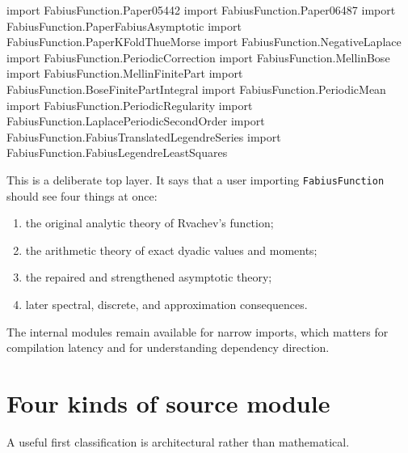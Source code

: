 \documentclass[11pt,a4paper,openany]{book}
\begin{document}
\begin{LeanCode}
import FabiusFunction.Paper05442
import FabiusFunction.Paper06487
import FabiusFunction.PaperFabiusAsymptotic
import FabiusFunction.PaperKFoldThueMorse
import FabiusFunction.NegativeLaplace
import FabiusFunction.PeriodicCorrection
import FabiusFunction.MellinBose
import FabiusFunction.MellinFinitePart
import FabiusFunction.BoseFinitePartIntegral
import FabiusFunction.PeriodicMean
import FabiusFunction.PeriodicRegularity
import FabiusFunction.LaplacePeriodicSecondOrder
import FabiusFunction.FabiusTranslatedLegendreSeries
import FabiusFunction.FabiusLegendreLeastSquares
\end{LeanCode}

This is a deliberate top layer.  It says that a user importing
\texttt{FabiusFunction} should see four things at once:
\begin{enumerate}
  \item the original analytic theory of Rvachev's function;
  \item the arithmetic theory of exact dyadic values and moments;
  \item the repaired and strengthened asymptotic theory;
  \item later spectral, discrete, and approximation consequences.
\end{enumerate}
The internal modules remain available for narrow imports, which matters for
compilation latency and for understanding dependency direction.

\section{Four kinds of source module}
A useful first classification is architectural rather than mathematical.
\end{document}

